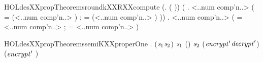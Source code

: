 \begin{SaveVerbatim}{HOLdesXXpropTheoremsroundkXXRXXcompute}
\HOLTokenTurnstile{} (\HOLSymConst{\HOLTokenForall{}}.    \HOLSymConst{=}  ( )) \HOLSymConst{\HOLTokenConj{}}
   (\HOLSymConst{\HOLTokenForall{}} .
       <..num comp'n..>  \HOLSymConst{=}
      (
          =  (<..num comp'n..> \HOLSymConst{\ensuremath{-}} ) ;
          =  (<..num comp'n..> \HOLSymConst{\ensuremath{-}} ) 
          \HOLSymConst{\HOLTokenRol{}} )) \HOLSymConst{\HOLTokenConj{}}
   \HOLSymConst{\HOLTokenForall{}} .
      <..num comp'n..>  \HOLSymConst{=}
     (
         =  <..num comp'n..> ;
         =  <..num comp'n..> 
         \HOLSymConst{\HOLTokenRol{}} )
\end{SaveVerbatim}
\newcommand{\HOLdesXXpropTheoremsroundkXXRXXcompute}{\UseVerbatim{HOLdesXXpropTheoremsroundkXXRXXcompute}}
\begin{SaveVerbatim}{HOLdesXXpropTheoremssemiKXXproperOne}
\HOLTokenTurnstile{} \HOLSymConst{\HOLTokenForall{}} .
        \HOLSymConst{\HOLTokenConj{}}  \HOLSymConst{=} (\ensuremath{\HOLFreeVar{s}\sb{\mathrm{1}}}\HOLSymConst{,}\ensuremath{\HOLFreeVar{s}\sb{\mathrm{2}}}) \HOLSymConst{\HOLTokenConj{}}
      \ensuremath{\HOLFreeVar{s}\sb{\mathrm{1}}} \HOLSymConst{=} (\HOLSymConst{,}) \HOLSymConst{\HOLTokenConj{}}
      \ensuremath{\HOLFreeVar{s}\sb{\mathrm{2}}} \HOLSymConst{=} (\ensuremath{\HOLFreeVar{encrypt}\sp{\prime{}}}\HOLSymConst{,}\ensuremath{\HOLFreeVar{decrypt}\sp{\prime{}}}) \HOLSymConst{\HOLTokenImp{}}
      (\ensuremath{\HOLFreeVar{encrypt}\sp{\prime{}}} ) \HOLSymConst{=} 
\end{SaveVerbatim}
\newcommand{\HOLdesXXpropTheoremssemiKXXproperOne}{\UseVerbatim{HOLdesXXpropTheoremssemiKXXproperOne}}
